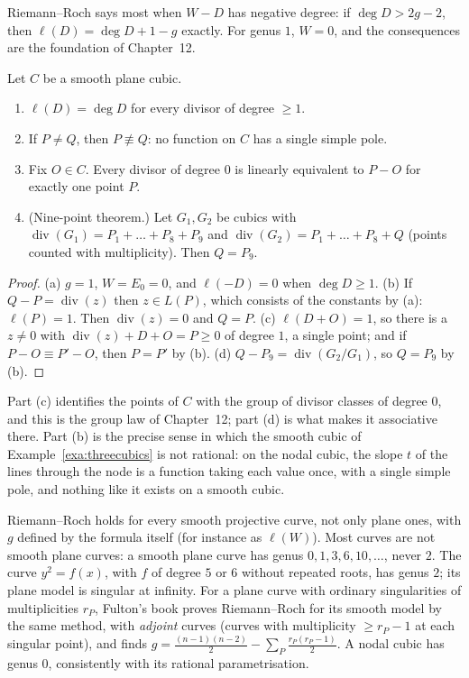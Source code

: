 Riemann--Roch says most when $W-D$ has negative degree: if $\deg D>2g-2$, then $\ell(D)=\deg D+1-g$ exactly. For genus $1$, $W=0$, and the
consequences are the foundation of Chapter~12.

\begin{corollary}\label{cor:genus1}
Let $C$ be a smooth plane cubic.
\begin{enumerate}[label=(\alph*)]
\item $\ell(D)=\deg D$ for every divisor of degree $\ge1$.
\item If $P\ne Q$, then $P\not\equiv Q$: no function on $C$ has a single simple pole.
\item Fix $O\in C$. Every divisor of degree $0$ is linearly equivalent to $P-O$ for exactly one point $P$.
\item (Nine-point theorem.) Let $G_1,G_2$ be cubics with $\operatorname{div}(G_1)=P_1+\dots+P_8+P_9$ and $\operatorname{div}(G_2)=P_1+\dots+P_8+Q$ (points
counted with multiplicity). Then $Q=P_9$.
\end{enumerate}
\end{corollary}
\begin{proof}
(a) $g=1$, $W=E_0=0$, and $\ell(-D)=0$ when $\deg D\ge1$. (b) If $Q-P=\operatorname{div}(z)$ then $z\in L(P)$, which consists of the constants by (a):
$\ell(P)=1$. Then $\operatorname{div}(z)=0$ and $Q=P$. (c) $\ell(D+O)=1$, so there is a
$z\ne0$ with $\operatorname{div}(z)+D+O=P\ge0$ of degree $1$, a single point; and if $P-O\equiv P'-O$, then $P=P'$ by (b). (d) $Q-P_9=\operatorname{div}(G_2/G_1)$, so
$Q=P_9$ by (b).
\end{proof}

Part (c) identifies the points of $C$ with the group of divisor classes of degree $0$, and this is the group law of Chapter~12; part (d) is what
makes it associative there. Part (b) is the precise sense in which the smooth cubic of Example~\ref{exa:threecubics} is not rational: on the nodal cubic, the slope $t$ of the lines
through the node is a function taking each value once, with a single simple pole, and nothing like it exists on a smooth cubic.

\begin{remark}
Riemann--Roch holds for every smooth projective curve, not only plane ones, with $g$ defined by the formula itself (for instance as $\ell(W)$). Most curves
are not smooth plane curves: a smooth plane curve has genus $0,1,3,6,10,\dots$, never $2$. The curve $y^2=f(x)$, with $f$ of degree $5$ or $6$ without
repeated roots, has genus $2$; its plane model is singular at infinity. For a plane curve with ordinary singularities of multiplicities $r_P$, Fulton's
book proves Riemann--Roch for its smooth model by the same method, with \emph{adjoint} curves (curves with multiplicity $\ge r_P-1$ at each singular point),
and finds $g=\frac{(n-1)(n-2)}2-\sum_P\frac{r_P(r_P-1)}2$. A nodal cubic has genus $0$, consistently with its rational parametrisation.
\end{remark}

